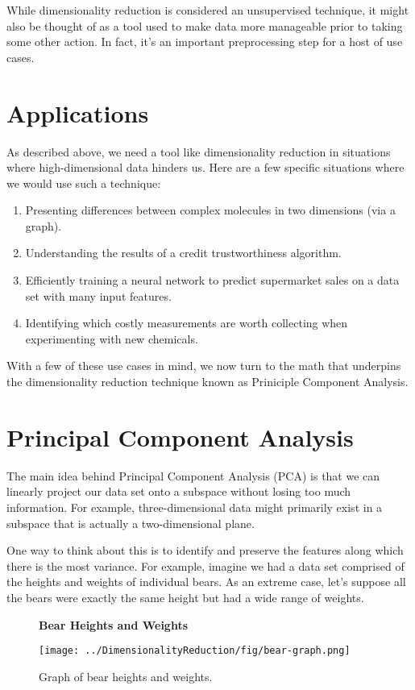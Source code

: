 While dimensionality reduction is considered an unsupervised technique, it might also be thought of as a tool used to make data more manageable prior to taking some other action. In fact, it's an important preprocessing step for a host of use cases.

\section{Applications}
As described above, we need a tool like dimensionality reduction in situations where high-dimensional data hinders us. Here are a few specific situations where we would use such a technique:

\begin{enumerate}
    \item Presenting differences between complex molecules in two dimensions (via a graph).
    \item Understanding the results of a credit trustworthiness algorithm.
    \item Efficiently training a neural network to predict supermarket sales on a data set with many input features.
    \item Identifying which costly measurements are worth collecting when experimenting with new chemicals.
\end{enumerate}

With a few of these use cases in mind, we now turn to the math that underpins the dimensionality reduction technique known as Priniciple Component Analysis.

\section{Principal Component Analysis}
The main idea behind Principal Component Analysis (PCA) is that we can linearly project our data set onto a subspace without losing too much information. For example, three-dimensional data might primarily exist in a subspace that is actually a two-dimensional plane.

One way to think about this is to identify and preserve the features along which there is the most variance. For example, imagine we had a data set comprised of the heights and weights of individual bears. As an extreme case, let's suppose all the bears were exactly the same height but had a wide range of weights.

\begin{figure}
    \centering
    \textbf{Bear Heights and Weights}\par\medskip
    \texttt{[image: ../DimensionalityReduction/fig/bear-graph.png]}
    \caption{Graph of bear heights and weights.}
    \label{fig:bear-graph}
\end{figure}

